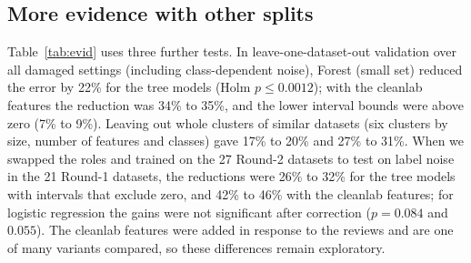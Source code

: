 \documentclass[conference]{IEEEtran}
\begin{document}
\subsection{More evidence with other splits}
Table~\ref{tab:evid} uses three further tests. In leave-one-dataset-out validation over all damaged settings (including class-dependent noise), Forest (small set) reduced the error by 22\% for the tree models (Holm $p\leq 0.0012$); with the cleanlab features the reduction was 34\% to 35\%, and the lower interval bounds were above zero (7\% to 9\%). Leaving out whole clusters of similar datasets (six clusters by size, number of features and classes) gave 17\% to 20\% and 27\% to 31\%. When we swapped the roles and trained on the 27 Round-2 datasets to test on label noise in the 21 Round-1 datasets, the reductions were 26\% to 32\% for the tree models with intervals that exclude zero, and 42\% to 46\% with the cleanlab features; for logistic regression the gains were not significant after correction ($p=0.084$ and $0.055$). The cleanlab features were added in response to the reviews and are one of many variants compared, so these differences remain exploratory.
\end{document}
